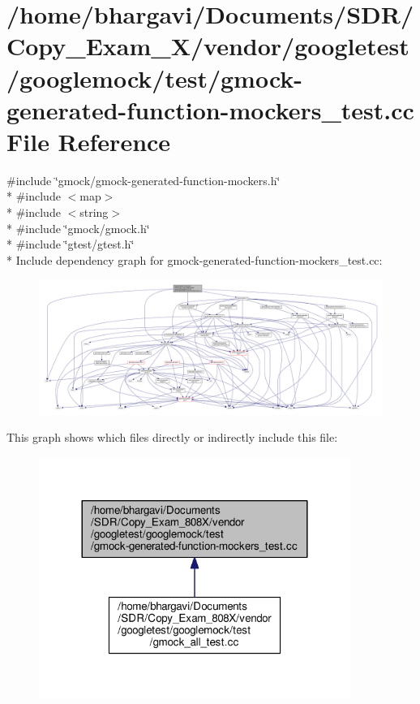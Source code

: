\hypertarget{gmock-generated-function-mockers__test_8cc}{}\section{/home/bhargavi/\+Documents/\+S\+D\+R/\+Copy\+\_\+\+Exam\+\_\+X/vendor/googletest/googlemock/test/gmock-\/generated-\/function-\/mockers\+\_\+test.cc File Reference}
\label{gmock-generated-function-mockers__test_8cc}
{\ttfamily \#include \char`\"{}gmock/gmock-\/generated-\/function-\/mockers.\+h\char`\"{}}\\*
{\ttfamily \#include $<$map$>$}\\*
{\ttfamily \#include $<$string$>$}\\*
{\ttfamily \#include \char`\"{}gmock/gmock.\+h\char`\"{}}\\*
{\ttfamily \#include \char`\"{}gtest/gtest.\+h\char`\"{}}\\*
Include dependency graph for gmock-\/generated-\/function-\/mockers\+\_\+test.cc\+:
\nopagebreak
\begin{figure}[H]
\begin{center}
\leavevmode
\includegraphics[width=350pt]{gmock-generated-function-mockers__test_8cc__incl}
\end{center}
\end{figure}
This graph shows which files directly or indirectly include this file\+:
\nopagebreak
\begin{figure}[H]
\begin{center}
\leavevmode
\includegraphics[width=288pt]{gmock-generated-function-mockers__test_8cc__dep__incl}
\end{center}
\end{figure}
